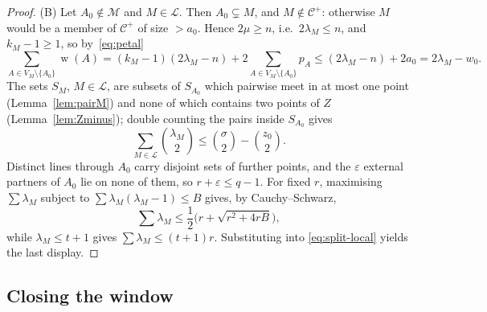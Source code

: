 \documentclass[11pt,a4paper]{amsart}
\theoremstyle{plain}
\theoremstyle{definition}
\newcommand{\Cc}{\mathcal{C}}
\newcommand{\Mm}{\mathcal{M}}
\newcommand{\Cp}{\Cc^{+}}
\DeclareMathOperator{\wt}{w}
\begin{document}
\begin{proof}
(B) Let $A_0\notin\Mm$ and $M\in\mathcal L$. Then $A_0\subsetneq M$, and
$M\notin\Cp$: otherwise $M$ would be a member of $\Cp$ of size $>a_0$. Hence
$2\mu\ge n$, i.e.\ $2\lambda_M\le n$, and $k_M-1\ge1$, so by~\eqref{eq:petal}
\[
  \sum_{A\in V_M\setminus\{A_0\}}\wt(A)
  =
  (k_M-1)(2\lambda_M-n)+2\sum_{A\in V_M\setminus\{A_0\}}p_A
  \le
  (2\lambda_M-n)+2a_0
  =
  2\lambda_M-w_0.
\]
The sets $S_M$, $M\in\mathcal L$, are subsets of $S_{A_0}$ which pairwise meet
in at most one point (Lemma~\ref{lem:pairM}) and none of which contains two
points of $Z$ (Lemma~\ref{lem:Zminus}); double counting the pairs inside
$S_{A_0}$ gives
\[
  \sum_{M\in\mathcal L}\binom{\lambda_M}{2}
  \le
  \binom{\sigma}{2}-\binom{z_0}{2}.
\]
Distinct lines through $A_0$ carry disjoint sets of further points, and the
$\varepsilon$ external partners of $A_0$ lie on none of them, so
$r+\varepsilon\le q-1$. For fixed $r$, maximising $\sum\lambda_M$ subject to
$\sum\lambda_M(\lambda_M-1)\le B$ gives, by Cauchy--Schwarz,
\[
  \sum\lambda_M
  \le
  \frac12\bigl(r+\sqrt{r^2+4rB}\bigr),
\]
while $\lambda_M\le t+1$ gives $\sum\lambda_M\le(t+1)r$. Substituting into
\eqref{eq:split-local} yields the last display.
\end{proof}

\subsection*{Closing the window}
\end{document}
